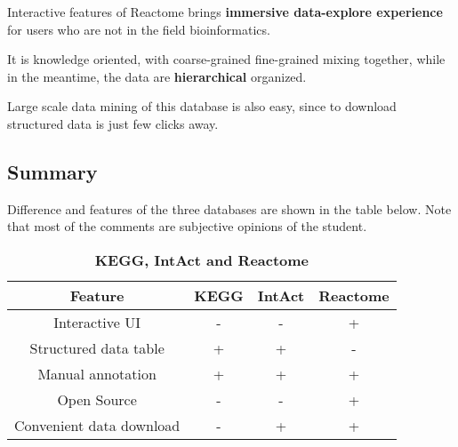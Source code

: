 \documentclass[cn,black,12pt,normal]{elegantnote}
\begin{document}
Interactive features of Reactome brings \textbf{immersive data-explore experience} for users who are not in the field bioinformatics. 

It is knowledge oriented, with coarse-grained fine-grained mixing together, while in the meantime, 
the data are \textbf{hierarchical} organized.

Large scale data mining of this database is also easy, since to download structured data is just few clicks away.

\subsection{Summary}
Difference and features of the three databases are shown in the table below.
Note that most of the comments are subjective opinions of the student.
\begin{table}[H]
    \caption{\textbf{KEGG, IntAct and Reactome}}
    \centering
    \begin{tabular}{cccc}
        \toprule
        Feature&KEGG&IntAct&Reactome\\
        \midrule
        Interactive UI&-&-&+\\
        Structured data table&+&+&-\\
        Manual annotation&+&+&+\\
        Open Source&-&-&+\\
        Convenient data download&-&+&+\\
        \bottomrule
    \end{tabular}
\end{table}

{}
\end{document}
